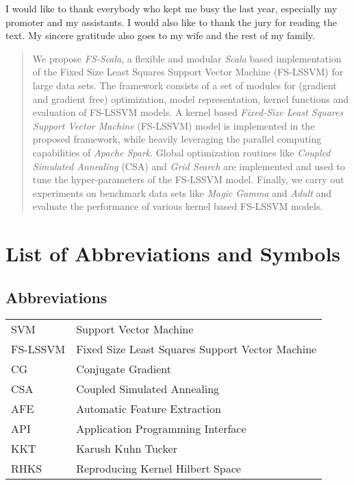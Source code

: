 \documentclass[master=mai,masteroption=ecs]{kulemt}
\begin{document}
\begin{preface}
  I would like to thank everybody who kept me busy the last year,
  especially my promoter and my assistants. I would also like to thank the
  jury for reading the text. My sincere gratitude also goes to my wife and
  the rest of my family.
\end{preface}

\tableofcontents*

\begin{abstract}
We propose \textit{FS-Scala}, a flexible and modular \textit{Scala} based implementation of the Fixed Size Least Squares Support Vector Machine (FS-LSSVM) for large data sets. The framework consists of a set of modules for (gradient and gradient free) optimization, model representation, kernel functions and evaluation of FS-LSSVM models. A kernel based \textit{Fixed-Size Least Squares Support Vector Machine} (FS-LSSVM) model is implemented in the proposed framework, while heavily leveraging the parallel computing capabilities of \textit{Apache Spark}. Global optimization routines like \emph{Coupled Simulated Annealing} (CSA) and \emph{Grid Search} are implemented and used to tune the hyper-parameters of the FS-LSSVM model. Finally, we carry out experiments on benchmark data sets like \emph{Magic Gamma} and \emph{Adult} and evaluate the performance of various kernel based FS-LSSVM models.
\end{abstract}

\listoffiguresandtables
\chapter{List of Abbreviations and Symbols}
\section*{Abbreviations}
\begin{flushleft}
  \renewcommand{\arraystretch}{1.1}
  \begin{tabularx}{\textwidth}{@{}p{12mm}X@{}}
    SVM   & Support Vector Machine \\
    FS-LSSVM   & Fixed Size Least Squares Support Vector Machine \\
    CG   & Conjugate Gradient \\
    CSA  & Coupled Simulated Annealing \\
    AFE  & Automatic Feature Extraction \\
    API  & Application Programming Interface \\ 
    KKT  & Karush Kuhn Tucker \\
    RHKS & Reproducing Kernel Hilbert Space\\
  \end{tabularx}
\end{flushleft}
\end{document}
